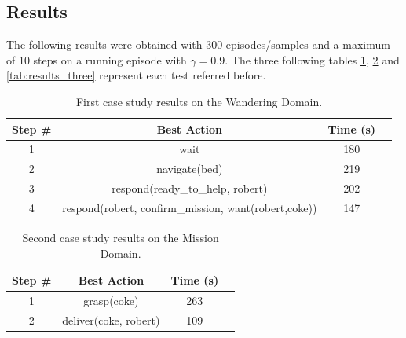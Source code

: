 \subsection{Results}

The following results were obtained with 300 episodes/samples and a maximum of 
10 steps on a running episode with $\gamma=0.9$. The three following tables 
\ref{tab:results_one}, \ref{tab:results_two} and \ref{tab:results_three} 
represent each test referred before.

\begin{table}[H]
\centering
\begin{tabular}{ |c|c|c|c| }
 \hline
Step \# & Best Action                                          &  Time (s) \\
 \hline
1       & wait                                                 & 180               \\
2       & navigate(bed)                                        & 219               \\
3       & respond(ready\_to\_help, robert)                     & 202               \\
4       & respond(robert, confirm\_mission, want(robert,coke)) & 147              \\
\hline
\end{tabular}
\label{tab:results_one}
\caption{First case study results on the Wandering Domain.}
\end{table}


\begin{table}[H]
\centering
\begin{tabular}{ |c|c|c|c| }
 \hline
Step \# & Best Action                                          &  Time (s) \\
 \hline
1       & grasp(coke)                                          & 263               \\
2       & deliver(coke, robert)                                & 109               \\
\hline
\end{tabular}
\label{tab:results_two}
\caption{Second case study results on the Mission Domain.}
\end{table}

